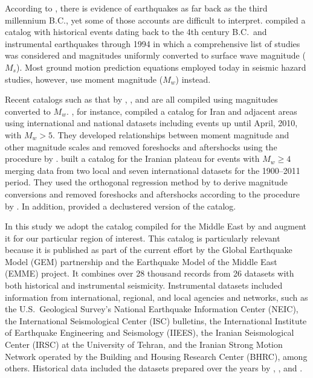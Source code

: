 According to \citet{Ambraseys_1982_Book}, there is evidence of earthquakes as far back as the third millennium B.C., yet some of those accounts are difficult to interpret. \citet{Mirzaei1997} compiled a catalog with historical events dating back to the 4th century B.C.~and instrumental earthquakes through 1994 in which a comprehensive list of studies was considered and magnitudes uniformly converted to surface wave magnitude ($M_s$). Most ground motion prediction equations employed today in seismic hazard studies, however, use moment magnitude ($M_w$) instead. 

Recent catalogs such as that by \citet{Karimiparidari2013}, \citet{Shahvar2013}, and \citet{Zare2014} are all compiled using magnitudes converted to $M_w$. \citet{Karimiparidari2013}, for instance, compiled a catalog for Iran and adjacent areas using international and national datasets including events up until April, 2010, with $M_w > 5$. They developed relationships between moment magnitude and other magnitude scales and removed foreshocks and aftershocks using the procedure by \citet{Gardner1974}. \citet{Shahvar2013} built a catalog for the Iranian plateau for events with $M_w \geq 4$ merging data from two local and seven international datasets for the 1900--2011 period. They used the orthogonal regression method by \citet{Castellaro2006} to derive magnitude conversions and removed foreshocks and aftershocks according to the procedure by \citet{Uhrhammer_1986_EN}. In addition, \citet{Shahvar2013} provided a declustered version of the catalog. 

In this study we adopt the catalog compiled for the Middle East by \citet{Zare2014} and augment it for our particular region of interest. This catalog is particularly relevant because it is published as part of the current effort by the Global Earthquake Model (GEM) partnership and the Earthquake Model of the Middle East (EMME) project. It combines over 28 thousand records from 26 datasets with both historical and instrumental seismicity. Instrumental datasets included information from international, regional, and local agencies and networks, such as the U.S.~Geological Survey's National Earthquake Information Center (NEIC), the International Seismological Center (ISC) bulletins, the International Institute of Earthquake Engineering and Seismology (IIEES), the Iranian Seismological Center (IRSC) at the University of Tehran, and the Iranian Strong Motion Network operated by the Building and Housing Research Center (BHRC), among others. Historical data included the datasets prepared over the years by \citet{Ambraseys_1982_Book}, \citet{Ambraseys_2005_Book}, and \citet{Ambraseys_2009_Book}.

